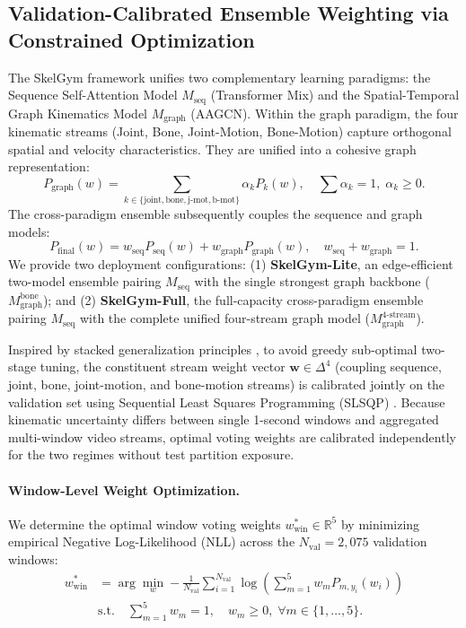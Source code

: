 \documentclass[runningheads]{llncs}
\begin{document}
\subsection{Validation-Calibrated Ensemble Weighting via Constrained Optimization}
The SkelGym framework unifies two complementary learning paradigms: the Sequence Self-Attention Model $M_{\text{seq}}$ (Transformer Mix) and the Spatial-Temporal Graph Kinematics Model $M_{\text{graph}}$ (AAGCN). Within the graph paradigm, the four kinematic streams (Joint, Bone, Joint-Motion, Bone-Motion) capture orthogonal spatial and velocity characteristics. They are unified into a cohesive graph representation:
\begin{equation}
    P_{\text{graph}}(w) = \sum_{k \in \{\text{joint}, \text{bone}, \text{j-mot}, \text{b-mot}\}} \alpha_k P_k(w), \quad \sum \alpha_k = 1, \; \alpha_k \ge 0.
\end{equation}
The cross-paradigm ensemble subsequently couples the sequence and graph models:
\begin{equation}
    P_{\text{final}}(w) = w_{\text{seq}} P_{\text{seq}}(w) + w_{\text{graph}} P_{\text{graph}}(w), \quad w_{\text{seq}} + w_{\text{graph}} = 1.
\end{equation}
We provide two deployment configurations: (1) \textbf{SkelGym-Lite}, an edge-efficient two-model ensemble pairing $M_{\text{seq}}$ with the single strongest graph backbone ($M_{\text{graph}}^{\text{bone}}$); and (2) \textbf{SkelGym-Full}, the full-capacity cross-paradigm ensemble pairing $M_{\text{seq}}$ with the complete unified four-stream graph model ($M_{\text{graph}}^{\text{4-stream}}$).

Inspired by stacked generalization principles \cite{wolpert1992stacking}, to avoid greedy sub-optimal two-stage tuning, the constituent stream weight vector $\mathbf{w} \in \Delta^4$ (coupling sequence, joint, bone, joint-motion, and bone-motion streams) is calibrated jointly on the validation set using Sequential Least Squares Programming (SLSQP) \cite{kraft1988,virtanen2020}. Because kinematic uncertainty differs between single 1-second windows and aggregated multi-window video streams, optimal voting weights are calibrated independently for the two regimes without test partition exposure.

\paragraph{Window-Level Weight Optimization.} We determine the optimal window voting weights $w_{\text{win}}^* \in \mathbb{R}^5$ by minimizing empirical Negative Log-Likelihood (NLL) across the $N_{\text{val}} = 2,075$ validation windows:
\begin{align}
\label{eq:ensemble_opt}
    w_{\text{win}}^* &= \arg\min_{w} -\frac{1}{N_{\text{val}}} \sum_{i=1}^{N_{\text{val}}} \log \left( \sum_{m=1}^5 w_m P_{m, y_i}(w_i) \right) \\
\label{eq:simplex}
    &\text{s.t.} \quad \sum_{m=1}^5 w_m = 1, \quad w_m \ge 0, \; \forall m \in \{1, \dots, 5\}.
\end{align}
\end{document}
